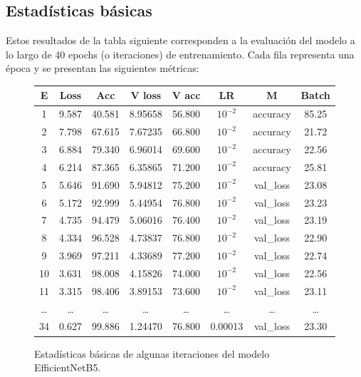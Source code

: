 \subsection{Estadísticas básicas}\label{sub:basic_statistics_p2}
    
    Estos resultados de la tabla siguiente corresponden a la evaluación del modelo a lo largo de 40 epochs (o iteraciones) de entrenamiento. Cada fila representa una época y se presentan las siguientes métricas:
    
    \begin{figure}[ht]
      \small
      \begin{center}
          \begin{tabular}{|c|c|c|c|c|c|c|c|} \hline
          E & Loss & Acc & V loss & V acc & LR & M & Batch \\ \hline
          1 & 9.587 & 40.581 & 8.95658 & 56.800 & $10^{-2}$ & accuracy & 85.25 \\ \hline
          2 & 7.798 & 67.615 & 7.67235 & 66.800 & $10^{-2}$ & accuracy & 21.72 \\ \hline
          3 & 6.884 & 79.340 & 6.96014 & 69.600 & $10^{-2}$ & accuracy & 22.56 \\ \hline
          4 & 6.214 & 87.365 & 6.35865 & 71.200 & $10^{-2}$ & accuracy & 25.81 \\ \hline
          5 & 5.646 & 91.690 & 5.94812 & 75.200 & $10^{-2}$ & val\_loss & 23.08 \\ \hline
          6 & 5.172 & 92.999 & 5.44954 & 76.800 & $10^{-2}$ & val\_loss & 23.23 \\ \hline
          7 & 4.735 & 94.479 & 5.06016 & 76.400 & $10^{-2}$ & val\_loss & 23.19 \\ \hline
          8 & 4.334 & 96.528 & 4.73837 & 76.800 & $10^{-2}$ & val\_loss & 22.90 \\ \hline
          9 & 3.969 & 97.211 & 4.33689 & 77.200 & $10^{-2}$ & val\_loss & 22.74 \\ \hline
          10 & 3.631 & 98.008 & 4.15826 & 74.000 & $10^{-2}$ & val\_loss & 22.56 \\ \hline
          11 & 3.315 & 98.406 & 3.89153 & 73.600 & $10^{-2}$ & val\_loss & 23.11 \\ \hline
          \dots & \dots & \dots & \dots & \dots & \dots & \dots & \dots \\ \hline
          34 & 0.627 & 99.886 & 1.24470 & 76.800 & 0.00013 & val\_loss & 23.30 \\ \hline
          \end{tabular}
          \caption{Estadísticas básicas de algunas iteraciones del modelo EfficientNetB5.}
      \end{center}\label{fig:estadisticas_p2}
  \end{figure}
    

